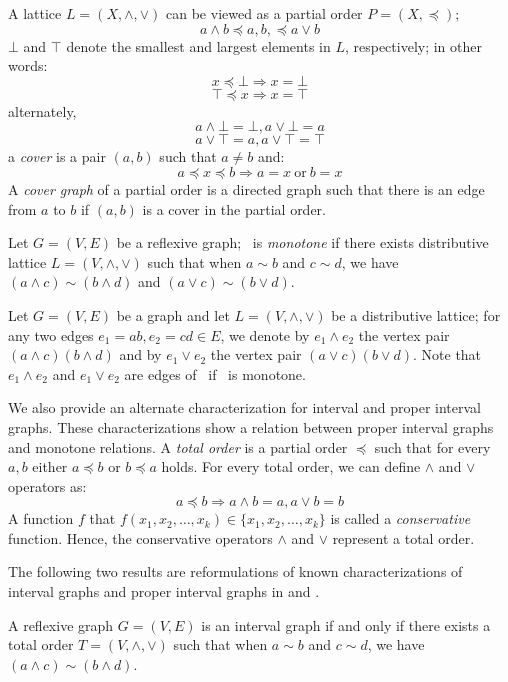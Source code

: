 A lattice \(L=(X,\wedge,\vee)\) can be viewed as a partial order \(P=(X,\preceq)\);
\[ a\wedge b \preceq a,b, \preceq a\vee b\]
\(\bot\) and \(\top\) denote the smallest and largest elements in \(L\), respectively; in other words:
\[x \preceq \bot \Rightarrow x = \bot \]
\[\top \preceq x \Rightarrow x = \top \]
alternately,
\[a \wedge \bot = \bot, a \vee \bot = a\]
\[a \vee \top = a, a \vee \top = \top\]
a \emph{cover} is a pair \((a,b)\) such that \(a \neq b\) and:
\[a \preceq x \preceq b \Rightarrow a = x\ \mathrm{or}\ b = x\]
A \emph{cover graph} of a partial order is a directed graph such that there is
an edge from \(a\) to \(b\) if \((a,b)\) is a cover in the partial order.

\begin{defi} 
Let \(G=(V,E)\) be a reflexive graph; \mG\ is \emph{monotone} if there exists distributive lattice
\(L=(V, \wedge, \vee)\) such that
when \(a\sim b\) and \(c \sim d\), we have \((a \wedge c) \sim (b \wedge d)\) and \((a \vee c) \sim (b \vee d)\)\@.
\end{defi}

Let \(G=(V,E)\) be a graph and let \(L=(V, \wedge, \vee)\)  be a distributive lattice;
for any two edges \(e_1=ab, e_2=cd \in E\), we denote by
\(e_1\wedge e_2\) the vertex pair \((a\wedge c)(b \wedge d)\) and by \(e_1\vee e_2\) the vertex pair \((a \vee c)(b \vee d)\)\@.
Note that \(e_1\wedge e_2\) and \(e_1\vee e_2\) are edges of \mG\ if \mG\ is monotone.

We also provide an alternate characterization for interval and proper interval graphs.
These characterizations show a relation between proper interval graphs and monotone relations. 
A \emph{total order} is a partial order \(\preceq\) such that for every \(a, b\) either \(a \preceq b\)
or \(b \preceq a\) holds. For every total order, we can define \(\wedge\) and \(\vee\) operators as:
\[a \preceq b \Rightarrow a \wedge b = a, a \vee b = b\]
A function \(f\) that \(f(x_1,x_2,\dotsc,x_k)\in \{x_1,x_2,\dotsc,x_k\}\) is called
a \emph{conservative} function. Hence, the conservative operators \(\wedge\) and \(\vee\)
represent a total order.

The following two results are reformulations of known characterizations of interval graphs and
proper interval graphs in \cite{Gutin} and \cite{hellbook}\@.
\begin{theorem} \label{thm:semimin}
A reflexive graph \(G=(V,E)\) is an interval graph if and only if there exists
a total order \(T=(V,\wedge,\vee)\) such that
when \(a\sim b\) and \(c \sim d\), we have \((a \wedge c) \sim (b \wedge d)\)\@.
\end{theorem}

